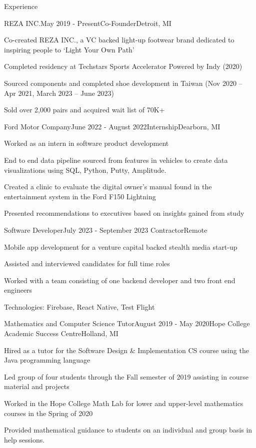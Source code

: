\documentclass[
	11pt, %
]{resume} %
\begin{document}
\begin{rSection}{Experience}
	\begin{rSubsection}{REZA INC.}{May 2019 - Present}{Co-Founder}{Detroit, MI}
  \item Co-created REZA INC., a VC backed light-up footwear
brand dedicated to inspiring people to ‘Light Your Own
Path’
\item Completed residency at Techstars Sports Accelerator Powered by Indy (2020)\item Sourced components and completed shoe development in Taiwan (Nov 2020 – Apr 2021, March 2023 – June 2023)
\item Sold over 2,000 pairs and acquired wait list of 70K+
	\end{rSubsection}


	\begin{rSubsection}{Ford Motor Company}{June 2022 - August 2022}{Internship}{Dearborn, MI}

  \item Worked as an intern in software product development  
  \item End to end data pipeline sourced from features in vehicles to create data visualizations using SQL, Python, Putty, Amplitude.
  \item  Created a clinic to evaluate the digital owner's manual found in the entertainment system in the Ford F150 Lightning
  \item Presented recommendations to executives based on insights gained from study
	\end{rSubsection}

	\begin{rSubsection}{Software Developer}{July 2023 - September 2023 }{Contractor}{Remote}
  \item Mobile app development for a venture capital backed stealth media start-up
  \item Assisted and interviewed candidates for full time roles
  \item Worked with a team consisting of one backend developer
and two front end engineers
\item Technologies: Firebase, React Native, Test Flight

	\end{rSubsection}

  \begin{rSubsection}{ Mathematics and Computer Science Tutor}{August 2019 - May 2020}{Hope College Academic Success Centre}{Holland, MI}
    \item Hired as a tutor for the Software Design \& Implementation CS course using the Java programming language
    \item Led group of four students through the Fall semester of 2019 assisting in course material and projects
    \item Worked in the Hope College Math Lab for lower and upper-level mathematics courses in the Spring of 2020
    \item  Provided mathematical guidance to students on an individual and group basis in help sessions.
	\end{rSubsection}


\end{rSection}
\end{document}
